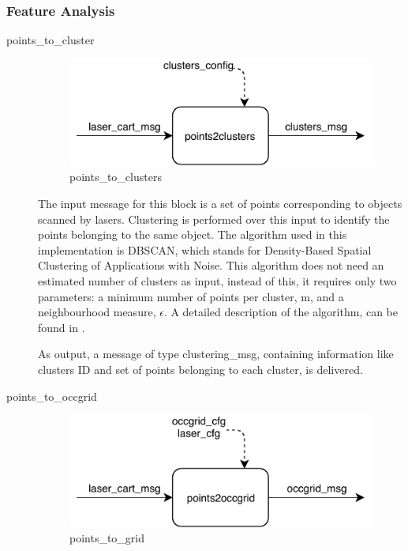 \subsubsection{Feature Analysis}
\begin{description}
\item[points\_to\_cluster] \hfill

\begin{figure}[ht!]
\centering
\includegraphics[scale=1]{fig/3/points_to_clusters.pdf}
\caption{points\_to\_clusters}
\label{points_to_clusters}
\end{figure}

The input message for this block is a set of points corresponding to objects scanned by lasers. Clustering is performed over this input to identify the points belonging to the same object. The algorithm used in this implementation is DBSCAN, which stands for Density-Based Spatial Clustering of Applications with Noise. This algorithm does not need an estimated number of clusters as input, instead of this, it requires only two parameters: a minimum number of points per cluster, m, and a neighbourhood measure, $\epsilon$. A detailed description of the algorithm, can be found in \cite{Ester96}.

As output, a message of type clustering\_msg, containing information like clusters ID and set of points belonging to each cluster, is delivered.

\item[points\_to\_occgrid] \hfill

\begin{figure}[ht!]
\centering
\includegraphics[scale=1]{fig/3/points_to_grid.pdf}
\caption{points\_to\_grid}
\label{points_to_grid}
\end{figure}


\end{description}
